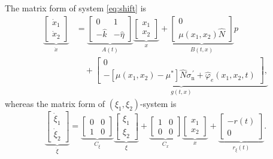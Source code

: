 \documentclass[journal,twoside,web]{ieeecolor}
\begin{document}
The matrix form of system \eqref{eq:shift} is
\begin{equation}
\begin{split}
\displaystyle
\underbrace{\begin{bmatrix}
\dot{x}_1 \\
\dot{x}_2
\end{bmatrix}}_{\dot{x}} &= 
\underbrace{\begin{bmatrix}
0 & 1 \\
-\hat{k} & -\hat{\eta}
\end{bmatrix}}_{A(t)}
\underbrace{\begin{bmatrix}
x_1 \\
x_2
\end{bmatrix}}_{x} + 
\underbrace{\begin{bmatrix}
0 \\
\mu(x_1,x_2) \hat{N}
\end{bmatrix}}_{B(t,x)} 
p \\ &\quad +
\underbrace{\begin{bmatrix}
0 \\
- [\mu(x_1,x_2) - \mu^* ] \hat{N} \sigma^{\, \prime}_{\mathrm{n}}+\hat{\varphi}_e(x_1,x_2,t)
\end{bmatrix},}_{g(t,x)}
\end{split}
\label{eq:system_mf_lqr}
\end{equation}
whereas the matrix form of $(\xi_1,\xi_2)$-system is
\begin{equation}
\displaystyle
\underbrace{\begin{bmatrix}
\dot{\xi}_1 \\
\dot{\xi}_2
\end{bmatrix}}_{\dot{\xi}} = 
\underbrace{\begin{bmatrix}
0 & 0 \\
1 & 0
\end{bmatrix}}_{C_{\xi}}
\underbrace{\begin{bmatrix}
\xi_1 \\
\xi_2
\end{bmatrix}}_{\xi} +
\underbrace{\begin{bmatrix}
1 & 0 \\
0 & 0
\end{bmatrix}}_{C_{x}}
\underbrace{\begin{bmatrix}
x_1 \\
x_2
\end{bmatrix}}_{x} 
+
\underbrace{\begin{bmatrix}
-r(t) \\
0
\end{bmatrix}}_{r_\xi(t)} .
\label{eq:double_integrator_mf}
\end{equation}
\end{document}
